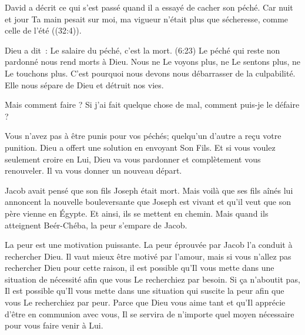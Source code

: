 
David a décrit ce qui s'est passé quand il a essayé de cacher son péché.
 \og Car nuit et jour Ta main pesait sur moi,
 ma vigueur n'était plus que sécheresse, comme celle de l'été \fg{}
 ((32:4)). 

Dieu a dit~: \og Le salaire du péché, c'est la mort. \fg{}
 (6:23)
 Le péché qui reste non pardonné nous rend morts à Dieu.
 Nous ne Le voyons plus, ne Le sentons plus, ne Le touchons plus.
 C'est pourquoi nous devons nous débarrasser de la culpabilité.
 Elle nous sépare de Dieu et détruit nos vies. 

Mais comment faire ? Si j'ai fait quelque chose de mal,
 comment puis-je le \og défaire \fg{} ? 

Vous n'avez pas à être punis pour vos péchés;
 quelqu'un d'autre a reçu votre punition.
 Dieu a offert une solution en envoyant Son Fils.
 Et si vous voulez seulement croire en Lui,
 Dieu va vous pardonner et complètement vous renouveler.
 Il va vous donner un nouveau départ.

\dvrule






 Jacob avait pensé que son fils Joseph était mort.
 Mais voilà que ses fils aînés lui annoncent la nouvelle bouleversante
 que Joseph est vivant et qu'il veut que son père vienne en Égypte.
 Et ainsi, ils se mettent en chemin.
 Mais quand ils atteignent Beér-Chéba, la peur s'empare de Jacob. 

La peur est une motivation puissante.
 La peur éprouvée par Jacob l'a conduit à rechercher Dieu.
 Il vaut mieux être motivé par l'amour,
 mais si vous n'allez pas rechercher Dieu pour cette raison,
 il est possible qu'Il vous mette dans une situation de nécessité
 afin que vous Le recherchiez par besoin.
 Si ça n'aboutit pas, Il est possible qu'Il vous mette
 dans une situation qui suscite la peur afin que vous Le recherchiez par peur.
 Parce que Dieu vous aime tant et qu'Il apprécie d'être en communion avec vous,
 Il se servira de n'importe quel moyen nécessaire pour vous faire venir à Lui.

